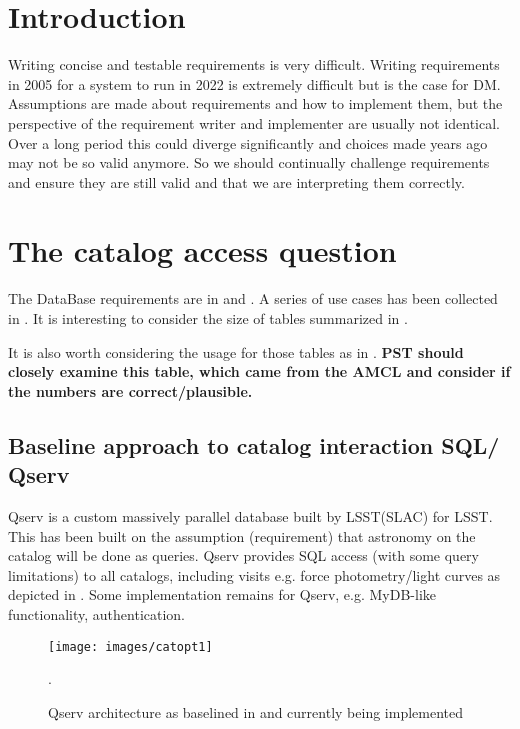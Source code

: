 \section{Introduction} \label{sec:intro}
 Writing concise and testable requirements is very difficult.
 Writing requirements in 2005 for a system to run in 2022 is extremely difficult but is the case for DM.
Assumptions are made about requirements and how to implement them, but
the perspective of the requirement writer and implementer are usually not identical.
Over a long period this could diverge significantly and  choices made years ago may not be so valid anymore.
So we should continually challenge requirements and ensure they are still valid and that we are interpreting them correctly.


\section{The catalog access question}\label{sec:cat}
The DataBase requirements are in  and .
A series of use cases has been collected in .
It is interesting to consider the size of tables summarized in .



It is also worth considering the usage for those tables as in . {\bf PST should closely examine this table, which came from the AMCL and consider if the numbers are correct/plausible.}

\subsection{Baseline approach to catalog interaction SQL/ Qserv}
\label{sec:qserv}
Qserv is a custom massively parallel database built by LSST(SLAC) for LSST.
This has been built on the assumption (requirement) that astronomy on the catalog will be done as queries.
Qserv provides SQL access (with some query limitations) to all catalogs, including visits e.g. force photometry/light curves as depicted in .
Some implementation remains for Qserv, e.g. MyDB-like functionality, authentication.

\begin{figure}
\begin{center}
 \texttt{[image: images/catopt1]}
\caption{Qserv architecture as baselined in  and currently being implemented \label{fig:catopt1}}.
\end{center}
\end{figure}


